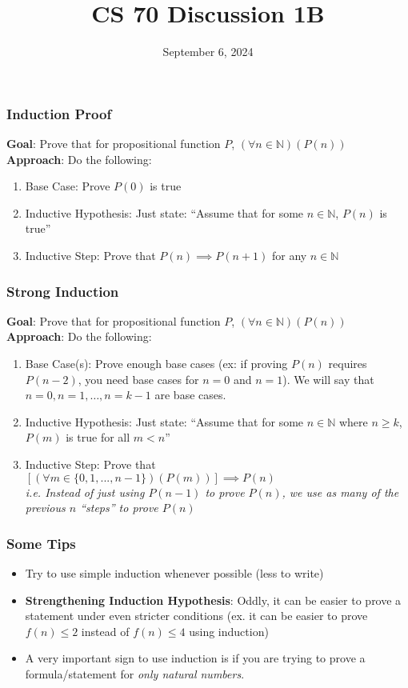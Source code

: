 \documentclass{beamer}
\title{CS 70 Discussion 1B}
\date{September 6, 2024}
\begin{document}
\frame{\titlepage}

\begin{frame}
\frametitle{Induction Proof}
{\bf Goal}: Prove that for propositional function $P$, $(\forall n\in\mathbb{N})(P(n))$\\
{\bf Approach}: Do the following:
\begin{enumerate}
    \item Base Case: Prove $P(0)$ is true
    \item Inductive Hypothesis: Just state: ``Assume that for some $n\in\mathbb{N}$, $P(n)$ is true''
    \item Inductive Step: Prove that $P(n)\implies P(n+1)$ for any $n\in\mathbb{N}$
\end{enumerate}
\end{frame}

\begin{frame}
\frametitle{Strong Induction}
{\bf Goal}: Prove that for propositional function $P$, $(\forall n\in\mathbb{N})(P(n))$\\
{\bf Approach}: Do the following:
\begin{enumerate}
    \item Base Case(s): Prove enough base cases (ex: if proving $P(n)$ requires $P(n-2)$, you need base cases for $n=0$ and $n=1$). We will say that $n=0,n=1,\dots,n=k-1$ are base cases.
    \item Inductive Hypothesis: Just state: ``Assume that for some $n\in\mathbb{N}$ where $n\geq k$, $P(m)$ is true for all $m<n$''
    \item Inductive Step: Prove that $\left[(\forall m\in\{0,1,...,n-1\})(P(m))\right]\implies P(n)$\\
    \it i.e. Instead of just using $P(n-1)$ to prove $P(n)$, we use as many of the previous $n$ ``steps'' to prove $P(n)$\rm
\end{enumerate}
\end{frame}

\begin{frame}
\frametitle{Some Tips}
\begin{itemize}
    \item Try to use simple induction whenever possible (less to write)
    \item {\bf Strengthening Induction Hypothesis}: Oddly, it can be easier to prove a statement under even stricter conditions (ex. it can be easier to prove $f(n)\leq 2$ instead of $f(n)\leq 4$ using induction)
    \item A very important sign to use induction is if you are trying to prove a formula/statement for {\it only natural numbers}.
\end{itemize}
\end{frame}
\end{document}
